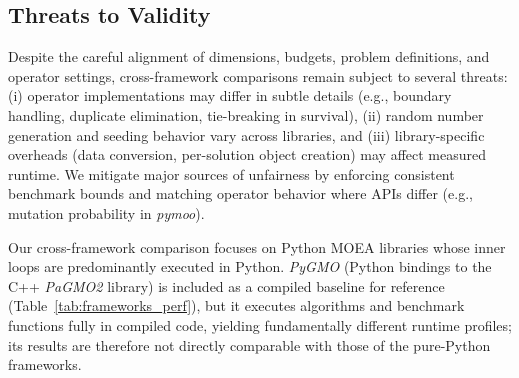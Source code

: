 \documentclass[final,5p,times,twocolumn]{elsarticle}
\newcommand{\VAMOS}{VAMOS}
\begin{document}




\subsection{Threats to Validity}

Despite the careful alignment of dimensions, budgets, problem definitions, and operator settings, cross-framework comparisons remain subject to several threats: (i) operator implementations may differ in subtle details (e.g., boundary handling, duplicate elimination, tie-breaking in survival), (ii) random number generation and seeding behavior vary across libraries, and (iii) library-specific overheads (data conversion, per-solution object creation) may affect measured runtime. We mitigate major sources of unfairness by enforcing consistent benchmark bounds and matching operator behavior where APIs differ (e.g., mutation probability in \textit{pymoo}).


Our cross-framework comparison focuses on Python MOEA libraries whose inner loops are predominantly executed in Python. \textit{PyGMO} (Python bindings to the C++ \textit{PaGMO2} library) is included as a compiled baseline for reference (Table~\ref{tab:frameworks_perf}), but it executes algorithms and benchmark functions fully in compiled code, yielding fundamentally different runtime profiles; its results are therefore not directly comparable with those of the pure-Python frameworks.
\end{document}

